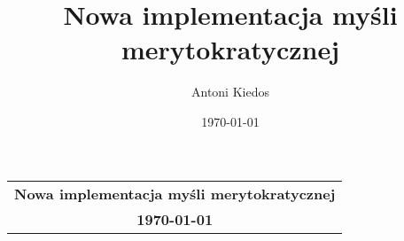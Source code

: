 \documentclass[12pt,a4paper]{article}
\title{Nowa implementacja myśli merytokratycznej}
\author{Antoni Kiedos}
\date{\today}
\begin{document}
\begin{center}
\begin{tabular}{c}
\textbf{Nowa implementacja myśli merytokratycznej} \\
\textbf{\today}
\end{tabular}
\end{center}
\end{document}
